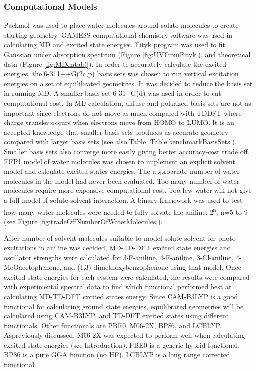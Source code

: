 \documentclass[
journal=jpcbfk, %
manuscript=article]{achemso}
\begin{document}
	\subsubsection{Computational Models} 
	Packmol was used to place water molecules around solute molecules to create starting geometry. GAMESS computational chemistry software was used in calculating MD and excited state energies. Fityk program\cite{Wojdyr2010} was used to fit Gaussian under absorption spectrum (Figure \ref{fig:UVFromFityk}), and theoretical data (Figure \ref{fig:MDdatab)}). In order to accurately calculate the excited energies, the 6-311++G(2d,p) basis sets was chosen to run vertical excitation energies on a set of equilibrated geometries. It was decided to reduce the basis set in running MD. A smaller basis set 6-31+G(d)\cite{Feller1996} was used in order to cut computational cost. In MD calculation, diffuse and polarized basis sets are not as important since electrons do not move as much compared with TDDFT where charge transfer occurs when electrons move from HOMO to LUMO. It is an accepted knowledge that smaller basis sets produces as accurate geometry compared with larger basis sets (see also Table \ref{Table:benchmarkBasisSets}). Smaller basis sets also converge more easily giving better accuracy-cost trade off. EFP1 model of water molecules was chosen to implement an explicit solvent model and calculate excited states energies. The appropriate number of water molecules in the model had never been evaluated. Too many number of water molecules require more expensive computational cost. Too few water will not give a full model of solute-solvent interaction. A binary framework was used to test how many water molecules were needed to fully solvate the aniline: 2\textsuperscript{n}, n=5 to 9 (see Figure \ref{fig:tradeOffNumberOfWaterMolecules}). 
	
	After number of solvent molecules suitable to model solute-solvent for photo-excitations in aniline was decided, MD-TD-DFT excited state energies and oscillator strengths were calculated for 3-F-aniline, 4-F-aniline, 3-Cl-aniline, 4-MeOacetophenone, and (1,3)-dimethoxybenzophenone using that model. Once excited state energies for each system were calculated, the results were compared with experimental spectral data to find which functional performed best at calculating MD-TD-DFT excited states energy.  Since CAM-B3LYP is a good functional for calculating ground state energies, equilibrated geometries will be calculated using CAM-B3LYP, and TD-DFT excited states using different functionals. Other functionals are PBE0, M06-2X, BP86, and LCBLYP. Aspreviously discussed, M06-2X was expected to perform well when calculating excited state energies (see Introduction). PBE0 is a generic hybrid functional. BP86 is a pure GGA function (no HF). LCBLYP is a long range corrected functional.
	
\end{document}
